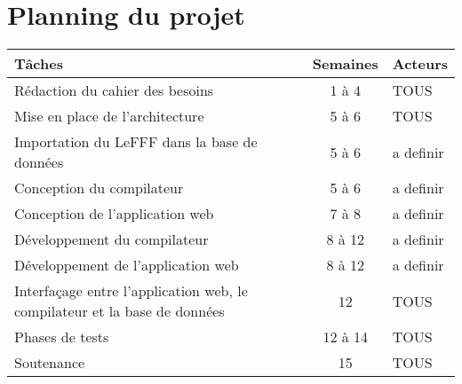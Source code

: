 
\section{Planning du projet}

 \begin{tabularx}{\textwidth}{|p{7cm}|c|X|}
    \hline
    \textbf{Tâches} & 
    \textbf{Semaines} & 
    \textbf{Acteurs} \tabularnewline
    \hline
    Rédaction du cahier des besoins & 1 à 4 & TOUS \tabularnewline
    \hline
    Mise en place de l'architecture   & 5 à 6  & TOUS \tabularnewline
    \hline
    Importation du LeFFF dans la base de données  & 5 à 6 & a definir \tabularnewline
    \hline
    Conception du compilateur & 5 à 6 & a definir  \tabularnewline
    \hline
    Conception de l'application web & 7 à 8 & a definir  \tabularnewline
    \hline
    Développement du compilateur & 8 à 12 & a definir \tabularnewline
    \hline
    Développement de l'application web & 8 à 12 & a definir \tabularnewline
    \hline
    Interfaçage entre l'application web, le compilateur et la base de données & 12 & TOUS \tabularnewline
    \hline
    Phases de tests  & 12 à 14 & TOUS \tabularnewline
   \hline
    Soutenance & 15 & TOUS \tabularnewline
   \hline
\end{tabularx}
